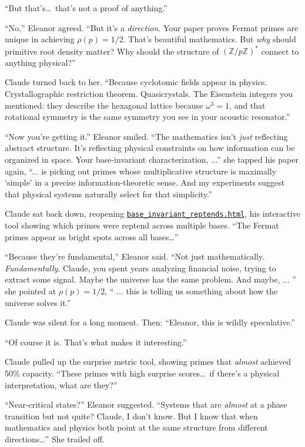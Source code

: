 ``But that's\ldots\ that's not a proof of anything.''

``No,'' Eleanor agreed. ``But it's a \emph{direction}. Your paper proves Fermat primes are unique in achieving $\rho(p) = 1/2$. That's beautiful mathematics. But \emph{why} should primitive root density matter? Why should the structure of $(\mathbb{Z}/p\mathbb{Z})^*$ connect to anything physical?''

Claude turned back to her. ``Because cyclotomic fields appear in physics. Crystallographic restriction theorem. Quasicrystals. The Eisenstein integers you mentioned: they describe the hexagonal lattice because $\omega^3 = 1$, and that rotational symmetry is the same symmetry you see in your acoustic resonator.''

``Now you're getting it.'' Eleanor smiled. ``The mathematics isn't \emph{just} reflecting abstract structure. It's reflecting physical constraints on how information can be organized in space. Your base-invariant characterization, ...'' she tapped his paper again, ``... is picking out primes whose multiplicative structure is maximally `simple' in a precise information-theoretic sense. And my experiments suggest that physical systems naturally select for that simplicity.''

Claude sat back down, reopening \href{base_invariant_reptends.html}{\texttt{base\_invariant\_reptends.html}}, his interactive tool showing which primes were reptend across multiple bases. ``The Fermat primes appear as bright spots across all bases\ldots''

``Because they're fundamental,'' Eleanor said. ``Not just mathematically. \emph{Fundamentally}. Claude, you spent years analyzing financial noise, trying to extract some signal. Maybe the universe has the same problem. And maybe, ... '' she pointed at $\rho(p) = 1/2$, `` ... this is telling us something about how the universe solves it.''

Claude was silent for a long moment. Then: ``Eleanor, this is wildly speculative.''

``Of course it is. That's what makes it interesting.''

Claude pulled up the surprise metric tool, showing primes that \emph{almost} achieved 50\% capacity. ``These primes with high surprise scores\ldots\ if there's a physical interpretation, what are they?''

``Near-critical states?'' Eleanor suggested. ``Systems that are \emph{almost} at a phase transition but not quite? Claude, I don't know. But I know that when mathematics and physics both point at the same structure from different directions\ldots'' She trailed off.

